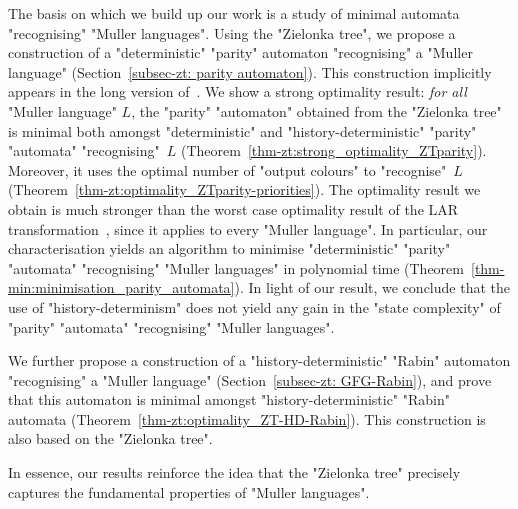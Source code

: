 \documentclass{theoretics}
\newenvironment{longdescription} %
{\begin{description}[style=unboxed]}
	{\end{description}}
\begin{document}
\begin{longdescription}
	\item[1. Minimal automata for Muller languages.] The basis on which we build up our work is a study of minimal automata "recognising" "Muller languages". Using the "Zielonka tree", we propose a construction of a "deterministic" "parity" automaton "recognising" a "Muller language" (Section~\ref{subsec-zt: parity automaton}). This construction implicitly appears in the long version of~\cite{DJW1997memory}. We show a strong optimality result: \emph{for all} "Muller language" $L$, the "parity" "automaton" obtained from the "Zielonka tree" is minimal both amongst "deterministic" and "history-deterministic" "parity" "automata" "recognising"~$L$ (Theorem~\ref{thm-zt:strong_optimality_ZTparity}).\footnotemark{} Moreover, it uses the optimal number of "output colours" to "recognise"~$L$ (Theorem~\ref{thm-zt:optimality_ZTparity-priorities}).  The optimality result we obtain is much stronger than the worst case optimality result of the LAR transformation~\cite{Loding1999Optimal}, since it applies to every "Muller language". In particular, our characterisation yields an algorithm to minimise "deterministic" "parity" "automata" "recognising" "Muller languages" in polynomial time (Theorem~\ref{thm-min:minimisation_parity_automata}).
	In light of our result, we conclude that the use of "history-determinism" does not yield any gain in the "state complexity" of "parity" "automata" "recognising" "Muller languages". 
	
	
	We further propose a construction of a "history-deterministic" "Rabin" automaton "recognising" a "Muller language" (Section~\ref{subsec-zt: GFG-Rabin}), and prove that this automaton is minimal amongst "history-deterministic" "Rabin" automata (Theorem~\ref{thm-zt:optimality_ZT-HD-Rabin}). This construction is also based on the "Zielonka tree". %
	
	In essence, our results reinforce the idea that the "Zielonka tree" precisely captures the fundamental properties of  "Muller languages".
	

\end{longdescription}
\end{document}
